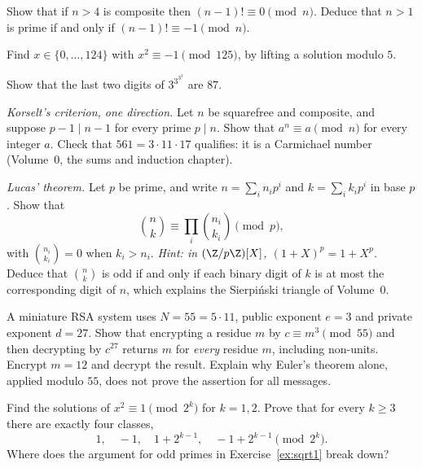 \begin{exercise}[$\star\star$]\label{ex:wilsonconv}
Show that if $n>4$ is composite then $(n-1)!\equiv0\pmod n$. Deduce that $n>1$ is prime if and only if $(n-1)!\equiv-1\pmod n$.
\end{exercise}

\begin{exercise}[$\star\star$]\label{ex:hensel}
Find $x\in\{0,\dots,124\}$ with $x^2\equiv-1\pmod{125}$, by lifting a solution modulo $5$.
\end{exercise}

\begin{exercise}[$\star\star$]\label{ex:tower}
Show that the last two digits of $3^{3^{3^3}}$ are $87$.
\end{exercise}

\begin{exercise}[$\star\star$]\label{ex:korselt}
\emph{Korselt's criterion, one direction.} Let $n$ be squarefree and composite, and suppose $p-1\mid n-1$ for every prime $p\mid n$. Show that $a^n\equiv a\pmod n$ for every integer $a$. Check that $561=3\cdot11\cdot17$ qualifies: it is a Carmichael number (Volume~0, the sums and induction chapter).
\end{exercise}

\begin{exercise}[$\star\star\star$]\label{ex:lucas}
\emph{Lucas' theorem.} Let $p$ be prime, and write $n=\sum_in_ip^i$ and $k=\sum_ik_ip^i$ in base $p$. Show that
\[
\binom nk\equiv\prod_i\binom{n_i}{k_i}\pmod p,
\]
with $\binom{n_i}{k_i}=0$ when $k_i>n_i$. \emph{Hint: in $(\Z/p\Z)[X]$, $(1+X)^p=1+X^p$.} Deduce that $\binom nk$ is odd if and only if each binary digit of $k$ is at most the corresponding digit of $n$, which explains the Sierpi\'nski triangle of Volume~0.
\end{exercise}

\begin{exercise}[$\star\star$]\label{ex:t1-toy-rsa}
A miniature RSA system uses $N=55=5\cdot11$, public exponent $e=3$ and private exponent $d=27$. Show that encrypting a residue $m$ by $c\equiv m^3\pmod{55}$ and then decrypting by $c^{27}$ returns $m$ for \emph{every} residue $m$, including non-units. Encrypt $m=12$ and decrypt the result. Explain why Euler's theorem alone, applied modulo $55$, does not prove the assertion for all messages.
\end{exercise}

\begin{exercise}[$\star\star\star$]\label{ex:t1-two-power-roots}
Find the solutions of $x^2\equiv1\pmod{2^k}$ for $k=1,2$. Prove that for every $k\ge3$ there are exactly four classes,
\[
1,\quad -1,\quad 1+2^{k-1},\quad -1+2^{k-1}\pmod{2^k}.
\]
Where does the argument for odd primes in Exercise~\ref{ex:sqrt1} break down?
\end{exercise}

